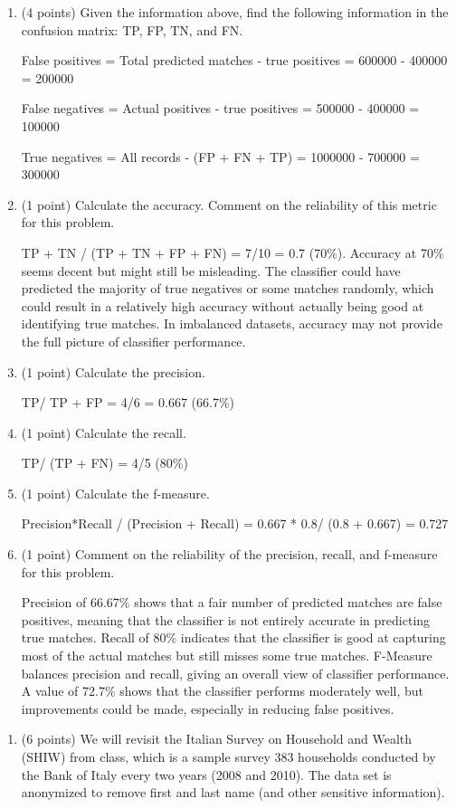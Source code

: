 \documentclass[
]{article}
\providecommand{\tightlist}{%
  \setlength{\itemsep}{0pt}\setlength{\parskip}{0pt}}
\begin{document}
\begin{enumerate}
\def\labelenumi{\alph{enumi}.}
\item
  (4 points) Given the information above, find the following information
  in the confusion matrix: TP, FP, TN, and FN.

  False positives = Total predicted matches - true positives = 600000 -
  400000 = 200000

  False negatives = Actual positives - true positives = 500000 - 400000
  = 100000

  True negatives = All records - (FP + FN + TP) = 1000000 - 700000 =
  300000
\item
  (1 point) Calculate the accuracy. Comment on the reliability of this
  metric for this problem.

  TP + TN / (TP + TN + FP + FN) = 7/10 = 0.7 (70\%). Accuracy at 70\%
  seems decent but might still be misleading. The classifier could have
  predicted the majority of true negatives or some matches randomly,
  which could result in a relatively high accuracy without actually
  being good at identifying true matches. In imbalanced datasets,
  accuracy may not provide the full picture of classifier performance.
\item
  (1 point) Calculate the precision.

  TP/ TP + FP = 4/6 = 0.667 (66.7\%)
\item
  (1 point) Calculate the recall.

  TP/ (TP + FN) = 4/5 (80\%)
\item
  (1 point) Calculate the f-measure.

  Precision*Recall / (Precision + Recall) = 0.667 * 0.8/ (0.8 + 0.667) =
  0.727
\item
  (1 point) Comment on the reliability of the precision, recall, and
  f-measure for this problem.

  Precision of 66.67\% shows that a fair number of predicted matches are
  false positives, meaning that the classifier is not entirely accurate
  in predicting true matches. Recall of 80\% indicates that the
  classifier is good at capturing most of the actual matches but still
  misses some true matches. F-Measure balances precision and recall,
  giving an overall view of classifier performance. A value of 72.7\%
  shows that the classifier performs moderately well, but improvements
  could be made, especially in reducing false positives.
\end{enumerate}

\begin{enumerate}
\def\labelenumi{\arabic{enumi}.}
\setcounter{enumi}{3}
\tightlist
\item
  (6 points) We will revisit the Italian Survey on Household and Wealth
  (SHIW) from class, which is a sample survey 383 households conducted
  by the Bank of Italy every two years (2008 and 2010). The data set is
  anonymized to remove first and last name (and other sensitive
  information).
\end{enumerate}
\end{document}
